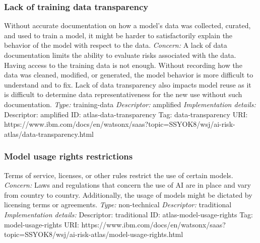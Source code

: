 \documentclass{article}
\begin{document}
\subsubsection*{Lack of training data transparency}
Without accurate documentation on how a model's data was collected, curated, and used to train a model, it might be harder to satisfactorily explain the behavior of the model with respect to the data.\newline
\textit{Concern: }A lack of data documentation limits the ability to evaluate risks associated with the data. Having access to the training data is not enough. Without recording how the data was cleaned, modified, or generated, the model behavior is more difficult to understand and to fix. Lack of data transparency also impacts model reuse as it is difficult to determine data representativeness for the new use without such documentation.\newline\newline
\textit{Type: }training-data\newline
\textit{Descriptor: }amplified \newline\newline
\textit{Implementation details:} \newline
Descriptor: amplified \newline
ID: atlas-data-transparency \newline
Tag: data-transparency \newline
URI:  https://www.ibm.com/docs/en/watsonx/saas?topic=SSYOK8/wsj/ai-risk-atlas/data-transparency.html\newline
\subsubsection*{Model usage rights restrictions}
Terms of service, licenses, or other rules restrict the use of certain models.\newline
\textit{Concern: }Laws and regulations that concern the use of AI are in place and vary from country to country. Additionally, the usage of models might be dictated by licensing terms or agreements.\newline\newline
\textit{Type: }non-technical\newline
\textit{Descriptor: }traditional \newline\newline
\textit{Implementation details:} \newline
Descriptor: traditional \newline
ID: atlas-model-usage-rights \newline
Tag: model-usage-rights \newline
URI:  https://www.ibm.com/docs/en/watsonx/saas?topic=SSYOK8/wsj/ai-risk-atlas/model-usage-rights.html\newline
\end{document}
